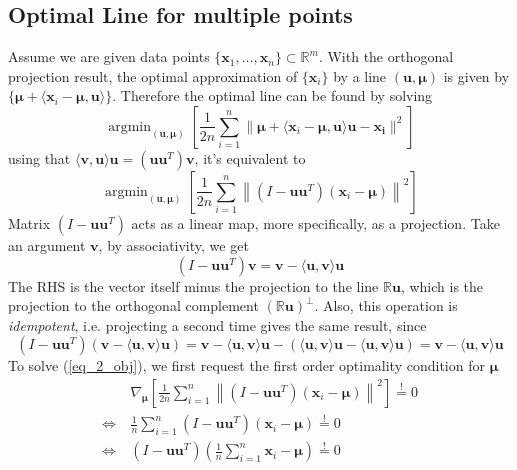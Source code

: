 \documentclass[../main.tex]{subfiles}
\begin{document}
\subsection{Optimal Line for multiple points}
Assume we are given data points $\{\bm{x}_1,\dots,\bm{x}_n\}\subset \mathbb{R}^m$. With the orthogonal projection result, the optimal approximation of $\{\bm{x}_i\}$ by a line $(\bm{u},\bm{\mu})$ is given by $\{\bm{\mu} + \langle \bm{x}_i-\bm{\mu},\bm{u} \rangle\}$. Therefore the optimal line can be found by solving
\begin{equation*}
\mathop{\arg\min}_{(\bm{u},\bm{\mu})} \left[ \frac{1}{2n}\sum_{i=1}^n \| \bm{\mu}+ \langle \bm{x}_i-\bm{\mu},\bm{u\rangle\bm{u} - \bm{x}_i} \|^2\right]
\end{equation*}
using that $\langle\bm{v},\bm{u}\rangle\bm{u}=(\bm{u}\bm{u}^T)\bm{v}$, it's equivalent to
\begin{equation}\label{eq_2_obj}
\mathop{\arg\min}_{(\bm{u},\bm{\mu})} \left[ \frac{1}{2n}\sum_{i=1}^n \left\| \left(I-\bm{u}\bm{u}^T \right)(\bm{x}_i-\bm{\mu}) \right\| ^2\right]
\end{equation}
Matrix $\left(I-\bm{u}\bm{u}^T \right)$ acts as a linear map, more specifically, as a projection. Take an argument $\bm{v}$, by associativity, we get
\begin{equation*}
\left(I-\bm{u}\bm{u}^T \right)\bm{v} = \bm{v} - \langle \bm{u}, \bm{v}\rangle\bm{u}
\end{equation*}
The RHS is the vector itself minus the projection to the line $\mathbb{R}\bm{u}$, which is the projection to the orthogonal complement $(\mathbb{R}\bm{u})^{\bot}$. Also, this operation is \emph{idempotent}, i.e. projecting a second time gives the same result, since
\begin{equation*}
\left(I-\bm{u}\bm{u}^T \right)( \bm{v} - \langle \bm{u}, \bm{v}\rangle\bm{u}) =  \bm{v} - \langle \bm{u}, \bm{v}\rangle\bm{u} - ( \langle \bm{u}, \bm{v}\rangle\bm{u} -  \langle \bm{u}, \bm{v}\rangle\bm{u}) =  \bm{v} - \langle \bm{u}, \bm{v}\rangle\bm{u}
\end{equation*}
To solve (\ref{eq_2_obj}), we first request the first order optimality condition for $\bm{\mu}$
\begin{align*}
&\nabla_{\bm{\mu}} \left[ \frac{1}{2n}\sum_{i=1}^n \left\| \left(I-\bm{u}\bm{u}^T \right)(\bm{x}_i-\bm{\mu}) \right\| ^2\right] \overset{!}{=} 0\\
\Longleftrightarrow ~&  \frac{1}{n}\sum_{i=1}^n  \left(I-\bm{u}\bm{u}^T \right)(\bm{x}_i-\bm{\mu}) \overset{!}{=} 0\\
\Longleftrightarrow ~& \left(I-\bm{u}\bm{u}^T \right)(\frac{1}{n}\sum_{i=1}^n\bm{x}_i-\bm{\mu})\overset{!}{=} 0
\end{align*}
\end{document}
